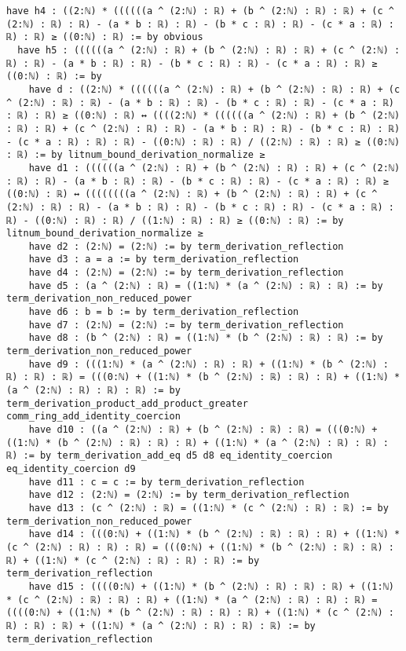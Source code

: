 \documentclass{article}
\begin{document}
\begin{tcolorbox}[colback=white!10, width=\linewidth]
\begin{lstlisting}[language=Lean4]
  have h4 : ((2:ℕ) * ((((((a ^ (2:ℕ) : ℝ) + (b ^ (2:ℕ) : ℝ) : ℝ) + (c ^ (2:ℕ) : ℝ) : ℝ) - (a * b : ℝ) : ℝ) - (b * c : ℝ) : ℝ) - (c * a : ℝ) : ℝ) : ℝ) ≥ ((0:ℕ) : ℝ) := by obvious
  have h5 : ((((((a ^ (2:ℕ) : ℝ) + (b ^ (2:ℕ) : ℝ) : ℝ) + (c ^ (2:ℕ) : ℝ) : ℝ) - (a * b : ℝ) : ℝ) - (b * c : ℝ) : ℝ) - (c * a : ℝ) : ℝ) ≥ ((0:ℕ) : ℝ) := by
    have d : ((2:ℕ) * ((((((a ^ (2:ℕ) : ℝ) + (b ^ (2:ℕ) : ℝ) : ℝ) + (c ^ (2:ℕ) : ℝ) : ℝ) - (a * b : ℝ) : ℝ) - (b * c : ℝ) : ℝ) - (c * a : ℝ) : ℝ) : ℝ) ≥ ((0:ℕ) : ℝ) ↔ ((((2:ℕ) * ((((((a ^ (2:ℕ) : ℝ) + (b ^ (2:ℕ) : ℝ) : ℝ) + (c ^ (2:ℕ) : ℝ) : ℝ) - (a * b : ℝ) : ℝ) - (b * c : ℝ) : ℝ) - (c * a : ℝ) : ℝ) : ℝ) - ((0:ℕ) : ℝ) : ℝ) / ((2:ℕ) : ℝ) : ℝ) ≥ ((0:ℕ) : ℝ) := by litnum_bound_derivation_normalize ≥
    have d1 : ((((((a ^ (2:ℕ) : ℝ) + (b ^ (2:ℕ) : ℝ) : ℝ) + (c ^ (2:ℕ) : ℝ) : ℝ) - (a * b : ℝ) : ℝ) - (b * c : ℝ) : ℝ) - (c * a : ℝ) : ℝ) ≥ ((0:ℕ) : ℝ) ↔ ((((((((a ^ (2:ℕ) : ℝ) + (b ^ (2:ℕ) : ℝ) : ℝ) + (c ^ (2:ℕ) : ℝ) : ℝ) - (a * b : ℝ) : ℝ) - (b * c : ℝ) : ℝ) - (c * a : ℝ) : ℝ) - ((0:ℕ) : ℝ) : ℝ) / ((1:ℕ) : ℝ) : ℝ) ≥ ((0:ℕ) : ℝ) := by litnum_bound_derivation_normalize ≥
    have d2 : (2:ℕ) = (2:ℕ) := by term_derivation_reflection
    have d3 : a = a := by term_derivation_reflection
    have d4 : (2:ℕ) = (2:ℕ) := by term_derivation_reflection
    have d5 : (a ^ (2:ℕ) : ℝ) = ((1:ℕ) * (a ^ (2:ℕ) : ℝ) : ℝ) := by term_derivation_non_reduced_power
    have d6 : b = b := by term_derivation_reflection
    have d7 : (2:ℕ) = (2:ℕ) := by term_derivation_reflection
    have d8 : (b ^ (2:ℕ) : ℝ) = ((1:ℕ) * (b ^ (2:ℕ) : ℝ) : ℝ) := by term_derivation_non_reduced_power
    have d9 : (((1:ℕ) * (a ^ (2:ℕ) : ℝ) : ℝ) + ((1:ℕ) * (b ^ (2:ℕ) : ℝ) : ℝ) : ℝ) = (((0:ℕ) + ((1:ℕ) * (b ^ (2:ℕ) : ℝ) : ℝ) : ℝ) + ((1:ℕ) * (a ^ (2:ℕ) : ℝ) : ℝ) : ℝ) := by term_derivation_product_add_product_greater comm_ring_add_identity_coercion
    have d10 : ((a ^ (2:ℕ) : ℝ) + (b ^ (2:ℕ) : ℝ) : ℝ) = (((0:ℕ) + ((1:ℕ) * (b ^ (2:ℕ) : ℝ) : ℝ) : ℝ) + ((1:ℕ) * (a ^ (2:ℕ) : ℝ) : ℝ) : ℝ) := by term_derivation_add_eq d5 d8 eq_identity_coercion eq_identity_coercion d9
    have d11 : c = c := by term_derivation_reflection
    have d12 : (2:ℕ) = (2:ℕ) := by term_derivation_reflection
    have d13 : (c ^ (2:ℕ) : ℝ) = ((1:ℕ) * (c ^ (2:ℕ) : ℝ) : ℝ) := by term_derivation_non_reduced_power
    have d14 : (((0:ℕ) + ((1:ℕ) * (b ^ (2:ℕ) : ℝ) : ℝ) : ℝ) + ((1:ℕ) * (c ^ (2:ℕ) : ℝ) : ℝ) : ℝ) = (((0:ℕ) + ((1:ℕ) * (b ^ (2:ℕ) : ℝ) : ℝ) : ℝ) + ((1:ℕ) * (c ^ (2:ℕ) : ℝ) : ℝ) : ℝ) := by term_derivation_reflection
    have d15 : ((((0:ℕ) + ((1:ℕ) * (b ^ (2:ℕ) : ℝ) : ℝ) : ℝ) + ((1:ℕ) * (c ^ (2:ℕ) : ℝ) : ℝ) : ℝ) + ((1:ℕ) * (a ^ (2:ℕ) : ℝ) : ℝ) : ℝ) = ((((0:ℕ) + ((1:ℕ) * (b ^ (2:ℕ) : ℝ) : ℝ) : ℝ) + ((1:ℕ) * (c ^ (2:ℕ) : ℝ) : ℝ) : ℝ) + ((1:ℕ) * (a ^ (2:ℕ) : ℝ) : ℝ) : ℝ) := by term_derivation_reflection

\end{lstlisting}
\end{tcolorbox}
\end{document}
